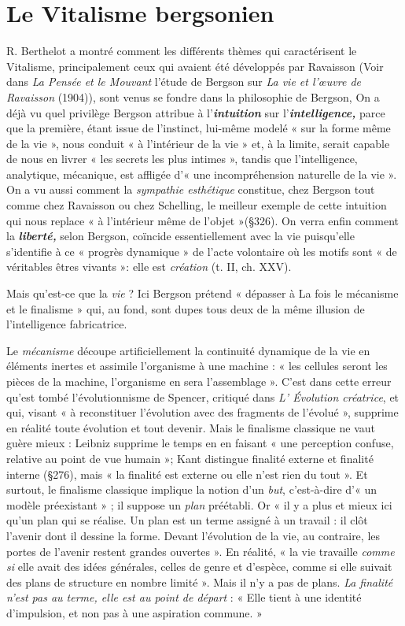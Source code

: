 \section{Le Vitalisme bergsonien}%
R. Berthelot a montré
comment les différents thèmes qui caractérisent le Vitalisme, principalement
ceux qui avaient été développés par Ravaisson
{\scriptsize (Voir dans {\it La Pensée et le Mouvant} l'étude de Bergson sur {\it La vie et l'œuvre de
Ravaisson} (1904))}, sont venus
se fondre dans la philosophie de Bergson, On a déjà vu quel privilège
Bergson attribue à l'\textbf{\textit {intuition}} sur l'\textbf{\textit {intelligence,}} parce que la
première, étant issue de l'instinct, lui-même modelé « sur la forme
même de la vie », nous conduit « à l’intérieur de la vie » et, à la limite,
serait capable de nous en livrer « les secrets les plus intimes », tandis
que l'intelligence, analytique, mécanique, est affligée d’« une incompréhension
naturelle de la vie ». On a vu aussi comment la {\it sympathie
esthétique} constitue, chez Bergson tout comme chez Ravaisson ou
chez Schelling, le meilleur exemple de cette intuition qui nous
replace « à l’intérieur même de l’objet »(\S326). On verra enfin comment
la \textbf{\textit {liberté,}} selon Bergson, coïncide essentiellement avec la vie puisqu’elle
s'identifie à ce « progrès dynamique » de l’acte volontaire où les motifs
sont « de véritables êtres vivants »: elle est {\it création} (t. II, ch. XXV).

Mais qu'est-ce que la {\it vie} ? Ici Bergson prétend « dépasser à La fois
le mécanisme et le finalisme » qui, au fond, sont dupes tous deux de
la même illusion de l'intelligence fabricatrice.

\vspace{0.24cm}
{\footnotesize Le \textsf{\textit {mécanisme}} découpe artificiellement la continuité dynamique de la vie
en éléments inertes et assimile l’organisme à une machine : « les cellules
seront les pièces de la machine, l'organisme en sera l'assemblage ». C’est
dans cette erreur qu’est tombé l’évolutionnisme de Spencer, critiqué dans
{\it L' Évolution créatrice}, et qui, visant « à reconstituer l’évolution avec des
fragments de l’évolué », supprime en réalité toute évolution et tout devenir.
Mais le finalisme classique ne vaut guère mieux : Leibniz supprime le temps
en en faisant « une perception confuse, relative au point de vue humain »;
Kant distingue finalité externe et finalité interne (\S 276), mais « la finalité
est externe ou elle n’est rien du tout ». Et surtout, le finalisme classique
implique la notion d’un {\it but}, c’est-à-dire d’« un modèle préexistant » ; il
suppose un {\it plan} préétabli. Or « il y a plus et mieux ici qu'un plan qui
se réalise. Un plan est un terme assigné à un travail : il clôt l’avenir dont il
dessine la forme. Devant l’évolution de la vie, au contraire, les portes de
l'avenir restent grandes ouvertes ». En réalité, « la vie travaille {\it comme si} elle
avait des idées générales, celles de genre et d'espèce, comme si elle suivait
des plans de structure en nombre limité ». Mais il n’y a pas de plans. {\it La
finalité n'est pas au terme, elle est au point de départ} : « Elle tient à une
identité d’impulsion, et non pas à une aspiration commune. »}
\vspace{0.31cm}

